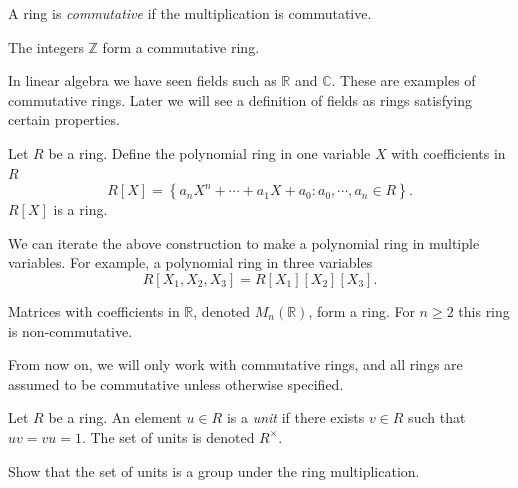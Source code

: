 \documentclass[a4paper,11pt]{article}
\begin{document}
    \begin{definition}
      A ring is \emph{commutative} if the multiplication is commutative.
    \end{definition}

    \begin{example}
      The integers \(\mathbb{Z}\) form a commutative ring.
    \end{example}

    \begin{example}
      In linear algebra we have seen fields such as \(\mathbb{R}\) and \(\mathbb{C}\). These are examples of commutative rings. Later we will see a definition of fields as rings satisfying certain properties.
    \end{example}

    \begin{example}
      Let \(R\) be a ring. Define the polynomial ring in one variable \(X\) with coefficients in \(R\)
      \[
        R[X] = \left\{ a_n X^n + \cdots + a_1 X + a_0 : a_0, \cdots, a_n \in R \right\}.
      \]
      \(R[X]\) is a ring.
    \end{example}

    \begin{example}
      We can iterate the above construction to make a polynomial ring in multiple variables. For example, a polynomial ring in three variables
      \[
        R[X_1, X_2, X_3] = R[X_1][X_2][X_3].
      \]
    \end{example}

    \begin{example}
      Matrices with coefficients in \(\mathbb{R}\), denoted \(M_n(\mathbb{R})\), form a ring. For \(n \ge 2\) this ring is non-commutative.
    \end{example}

    From now on, we will only work with commutative rings, and all rings are assumed to be commutative unless otherwise specified.

    \begin{definition}
      Let \(R\) be a ring. An element \(u \in R\) is a \emph{unit} if there exists \(v \in R\) such that \(uv = vu = 1\). The set of units is denoted \(R^\times\).
    \end{definition}

    \begin{exercise}
      Show that the set of units is a group under the ring multiplication.
    \end{exercise}
\end{document}
